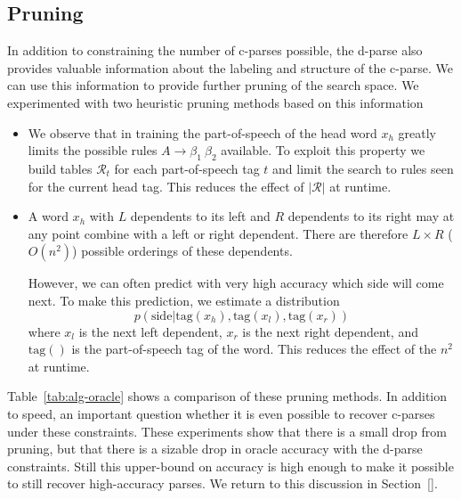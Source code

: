 \documentclass[11pt,letterpaper]{article}
\newcommand{\rules}{\mathcal{R}}
\newcommand{\Rule}[3]{#1 \rightarrow #2\ #3}
\newcommand{\TagFN}[1]{\mathrm{tag}({#1})}
\begin{document}
\subsection{Pruning}
\label{sec:prune}

In addition to constraining the number of c-parses possible, 
the d-parse also provides valuable information about the labeling 
and structure of the c-parse. We can use this information to provide 
further pruning of the search space. We experimented with two 
heuristic pruning methods based on this information

\begin{itemize}
\item We observe that in training the part-of-speech of the head word $x_h$
greatly limits the possible rules $\Rule{A}{\beta_1}{\beta_2}$ available.  To
exploit this property we build tables $\rules_t$ for each
part-of-speech tag $t$ and limit the search to rules seen for the
current head tag. This reduces the effect of $|\rules|$ at runtime.

\item A word $x_h$ with $L$ dependents to its left and $R$ dependents to 
its right may at any point  combine with a left or right dependent. There 
are therefore  $L\times R$ ($O(n^2)$) possible orderings of these dependents.

However, we can often predict with very high accuracy which side will come next. 
To make this prediction, we estimate a distribution \[p(\textrm{side} | \TagFN{x_h}, \TagFN{x_l}, \TagFN{x_r})\]
where $x_l$ is the next left dependent, $x_r$ is the next right dependent, and $\TagFN{}$ is the part-of-speech tag of the word. This reduces the  effect of the $n^2$ at runtime.
 

\end{itemize}

Table~\ref{tab:alg-oracle} shows a comparison of these pruning
methods.  In addition to speed, an important question whether it is
even possible to recover c-parses under these constraints.  These
experiments show that there is a small drop from pruning, but that
there is a sizable drop in oracle accuracy with the d-parse
constraints. Still this upper-bound on accuracy is high enough
to make it possible to still recover high-accuracy parses. We return 
to this discussion in Section~\ref{}.

\end{document}

